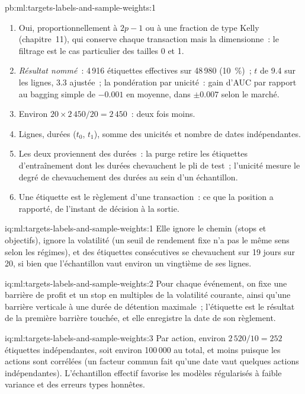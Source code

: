 \begin{solution}{pb:ml:targets-labels-and-sample-weights:1}
\begin{enumerate}
modèle primaire.
\item Oui, proportionnellement à $2p - 1$ ou à une fraction de type Kelly (chapitre~11), qui conserve chaque transaction mais la dimensionne~:
le filtrage est le cas particulier des tailles 0 et 1.
\item \emph{Résultat nommé}~: 4\,916 étiquettes effectives sur 48\,980 (10~\%)~; $t$ de 9.4 sur les lignes, 3.3 ajustée~; la pondération
par unicité~: gain d'AUC par rapport au bagging simple de $-0.001$ en moyenne, dans $\pm0.007$ selon le marché.
\item Environ $20\times2\,450/20 = 2\,450$~: deux fois moins.
\item Lignes, durées ($t_0$, $t_1$), somme des unicités et nombre de dates indépendantes.
\item Les deux proviennent des durées~: la purge retire les étiquettes d'entraînement dont les durées chevauchent le pli de test~; l'unicité mesure
le degré de chevauchement des durées au sein d'un échantillon.
\item Une étiquette est le règlement d'une transaction~: ce que la position a rapporté, de l'instant de décision à la sortie.
\end{enumerate}
\end{solution}

\begin{solution}{iq:ml:targets-labels-and-sample-weights:1}
Elle ignore le chemin (stops et objectifs), ignore la volatilité (un seuil de rendement fixe n'a pas le même sens selon les régimes), et
des étiquettes consécutives se chevauchent sur 19 jours sur 20, si bien que l'échantillon vaut environ un vingtième de ses
lignes.
\end{solution}

\begin{solution}{iq:ml:targets-labels-and-sample-weights:2}
Pour chaque événement, on fixe une barrière de profit et un stop en multiples de la volatilité courante, ainsi qu'une barrière verticale à une
durée de détention maximale~; l'étiquette est le résultat de la première barrière touchée, et elle enregistre la date de son règlement.
\end{solution}

\begin{solution}{iq:ml:targets-labels-and-sample-weights:3}
Par action, environ $2\,520/10 = 252$ étiquettes indépendantes, soit environ 100\,000 au total, et moins puisque les actions sont corrélées
(un facteur commun fait qu'une date vaut quelques actions indépendantes). L'échantillon effectif favorise les modèles régularisés à faible variance
et des erreurs types honnêtes.
\end{solution}


